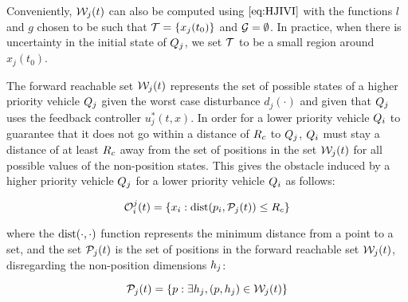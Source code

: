 Conveniently, $\mathcal{W}_j(t)$ can also be computed using $\eqref{eq:HJIVI}$ with the functions $l$ and $g$ chosen to be such that $\mathcal{T} = \{x_j(t_0)\}$ and $\mathcal{G} = \emptyset$. In practice, when there is uncertainty in the initial state of $Q_j$, we set $\mathcal{T}$ to be a small region around $x_j(t_0)$.

The forward reachable set $\mathcal{W}_j(t)$ represents the set of possible states of a higher priority vehicle $Q_j$ given the worst case disturbance $d_j(\cdot)$ and given that $Q_j$ uses the feedback controller $u_j^*(t, x)$. In order for a lower priority vehicle $Q_i$ to guarantee that it does not go within a distance of $R_c$ to $Q_j$, $Q_i$ must stay a distance of at least $R_c$ away from the set of positions in the set $\mathcal{W}_j(t)$ for all possible values of the non-position states. This gives the obstacle induced by a higher priority vehicle $Q_j$ for a lower priority vehicle $Q_i$ as follows:

\begin{equation}
\mathcal{O}_i^j(t) = \{x_i: \text{dist}(p_i, \mathcal{P}_j(t)) \le R_c \}
\end{equation}

\noindent where the $\text{dist}(\cdot, \cdot)$ function represents the minimum distance from a point to a set, and the set $\mathcal{P}_j(t)$ is the set of positions in the forward reachable set $\mathcal{W}_j(t)$, disregarding the non-position dimensions $h_j$:

\begin{equation}
\mathcal{P}_j(t) = \{p: \exists h_j, (p, h_j) \in \mathcal{W}_j(t)\}
\end{equation}

